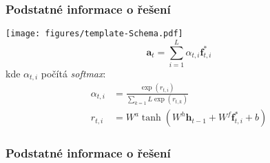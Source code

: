   
  
  \begin{frame}
    \frametitle{Podstatné informace o řešení}
    \centering\texttt{[image: figures/template-Schema.pdf]}
    \begin{equation}
        \mathbf{a}_t = \sum_{i=1}^{L}\alpha_{t,i}\mathbf{f}_{t,i}^{*}
    \end{equation}
    kde $\alpha_{t,i}$ počítá \emph{softmax}:
    \begin{align}
        \alpha_{t,i} &= \frac{\exp(r_{t,i})}{\sum_{k=1}{L}\exp(r_{t,k})} 
        \\
        r_{t,i} &= W^a \tanh\left( W^h \mathbf{h}_{t-1} + W^f\mathbf{f}_{t,i}^{*} + b \right)
    \end{align}
  \end{frame}
  
  \begin{frame}\frametitle{Podstatné informace o řešení}
  \end{frame}
  
  
  
